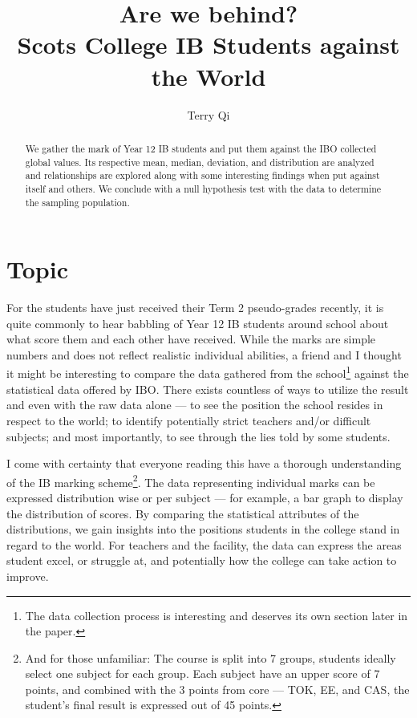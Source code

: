 \documentclass[a4paper,12pt]{tufte-handout}
\title{Are we behind?\\ \large Scots College IB Students against the World}
\author{Terry Qi}
\begin{document}
\maketitle

\begin{abstract}
    We gather the mark of Year 12 IB students and put them against the IBO collected global values. Its respective mean, median, deviation, and distribution are analyzed and relationships are explored along with some interesting findings when put against itself and others. We conclude with a null hypothesis test with the data to determine the sampling population.
\end{abstract}

\section{Topic}
For the students have just received their Term 2 pseudo-grades recently, it is quite commonly to hear babbling of Year 12 IB students around school about what score them and each other have received. While the marks are simple numbers and does not reflect realistic individual abilities, a friend and I thought it might be interesting to compare the data gathered from the school\footnote{The data collection process is interesting and deserves its own section later in the paper.} against the statistical data offered by IBO. There exists countless of ways to utilize the result and even with the raw data alone --- to see the position the school resides in respect to the world; to identify potentially strict teachers and/or difficult subjects; and most importantly, to see through the lies told by some students.

I come with certainty that everyone reading this have a thorough understanding of the IB marking scheme\footnote{And for those unfamiliar: The course is split into 7 groups, students ideally select one subject for each group. Each subject have an upper score of 7 points, and combined with the 3 points from core --- TOK, EE, and CAS, the student's final result is expressed out of 45 points.}. The data representing individual marks can be expressed distribution wise or per subject --- for example, a bar graph to display the distribution of scores. By comparing the statistical attributes of the distributions, we gain insights into the positions students in the college stand in regard to the world. For teachers and the facility, the data can express the areas student excel, or struggle at, and potentially how the college can take action to improve.
\end{document}
